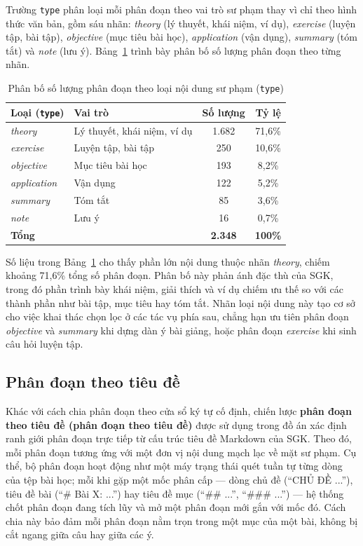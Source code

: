 \documentclass[../DoAn.tex]{subfiles}
\begin{document}
Trường \texttt{type} phân loại mỗi phân đoạn theo vai trò sư phạm thay vì chỉ theo hình thức văn bản, gồm sáu nhãn: \textit{theory} (lý thuyết, khái niệm, ví dụ), \textit{exercise} (luyện tập, bài tập), \textit{objective} (mục tiêu bài học), \textit{application} (vận dụng), \textit{summary} (tóm tắt) và \textit{note} (lưu ý). Bảng~\ref{tab:chunk-type} trình bày phân bố số lượng phân đoạn theo từng nhãn.

\begin{table}[!htbp]
\centering
\small
\begin{tabular}{|l|l|c|c|}
\hline
\textbf{Loại (\texttt{type})} & \textbf{Vai trò} & \textbf{Số lượng} & \textbf{Tỷ lệ} \\
\hline
\textit{theory} & Lý thuyết, khái niệm, ví dụ & 1.682 & 71,6\% \\
\textit{exercise} & Luyện tập, bài tập & 250 & 10,6\% \\
\textit{objective} & Mục tiêu bài học & 193 & 8,2\% \\
\textit{application} & Vận dụng & 122 & 5,2\% \\
\textit{summary} & Tóm tắt & 85 & 3,6\% \\
\textit{note} & Lưu ý & 16 & 0,7\% \\
\hline
\textbf{Tổng} & & \textbf{2.348} & \textbf{100\%} \\
\hline
\end{tabular}
\caption{Phân bố số lượng phân đoạn theo loại nội dung sư phạm (\texttt{type})}
\label{tab:chunk-type}
\end{table}

Số liệu trong Bảng~\ref{tab:chunk-type} cho thấy phần lớn nội dung thuộc nhãn \textit{theory}, chiếm khoảng 71,6\% tổng số phân đoạn. Phân bố này phản ánh đặc thù của SGK, trong đó phần trình bày khái niệm, giải thích và ví dụ chiếm ưu thế so với các thành phần như bài tập, mục tiêu hay tóm tắt. Nhãn loại nội dung này tạo cơ sở cho việc khai thác chọn lọc ở các tác vụ phía sau, chẳng hạn ưu tiên phân đoạn \textit{objective} và \textit{summary} khi dựng dàn ý bài giảng, hoặc phân đoạn \textit{exercise} khi sinh câu hỏi luyện tập.

\subsection{Phân đoạn theo tiêu đề}

Khác với cách chia phân đoạn theo cửa sổ ký tự cố định, chiến lược \textbf{phân đoạn theo tiêu đề (phân đoạn theo tiêu đề)} được sử dụng trong đồ án xác định ranh giới phân đoạn trực tiếp từ cấu trúc tiêu đề Markdown của SGK. Theo đó, mỗi phân đoạn tương ứng với một đơn vị nội dung mạch lạc về mặt sư phạm. Cụ thể, bộ phân đoạn hoạt động như một máy trạng thái quét tuần tự từng dòng của tệp bài học; mỗi khi gặp một mốc phân cấp --- dòng chủ đề (``CHỦ ĐỀ ...''), tiêu đề bài (``\# Bài X: ...'') hay tiêu đề mục (``\#\# ...'', ``\#\#\# ...'') --- hệ thống chốt phân đoạn đang tích lũy và mở một phân đoạn mới gắn với mốc đó. Cách chia này bảo đảm mỗi phân đoạn nằm trọn trong một mục của một bài, không bị cắt ngang giữa câu hay giữa các ý.
\end{document}
